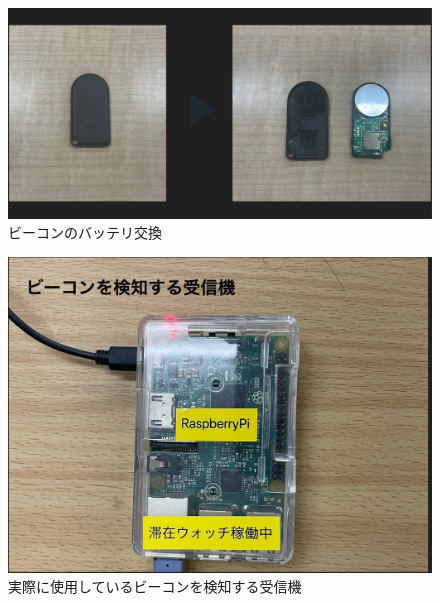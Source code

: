 
\begin{figure}[H]
  \begin{center}
    \includegraphics[width=150mm]{image/batchange.png}
    \caption{ビーコンのバッテリ交換}
    \label{fig:batchange}
  \end{center}
\end{figure}

\begin{figure}[H]
  \begin{center}
    \includegraphics[width=150mm]{image/RasPi.jpg}
    \caption{実際に使用しているビーコンを検知する受信機}
    \label{fig:raspi}
  \end{center}
\end{figure}

